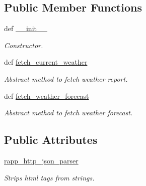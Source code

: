 \subsection*{Public Member Functions}
\begin{DoxyCompactItemize}
\item 
def \hyperlink{classrapp__weather__reporter_1_1weather__reporter__base_1_1WeatherReporterBase_aa0e1faaa2dcde236c7120c5c67dba93f}{\-\_\-\-\_\-init\-\_\-\-\_\-}
\begin{DoxyCompactList}\small\item\em Constructor. \end{DoxyCompactList}\item 
def \hyperlink{classrapp__weather__reporter_1_1weather__reporter__base_1_1WeatherReporterBase_adc2e313c45d4ec74f2d006cc6dce9ea4}{fetch\-\_\-current\-\_\-weather}
\begin{DoxyCompactList}\small\item\em Abstract method to fetch weather report. \end{DoxyCompactList}\item 
def \hyperlink{classrapp__weather__reporter_1_1weather__reporter__base_1_1WeatherReporterBase_aee6843b385bb5aa321ab7b4fd852bcdf}{fetch\-\_\-weather\-\_\-forecast}
\begin{DoxyCompactList}\small\item\em Abstract method to fetch weather forecast. \end{DoxyCompactList}\end{DoxyCompactItemize}
\subsection*{Public Attributes}
\begin{DoxyCompactItemize}
\item 
\hyperlink{classrapp__weather__reporter_1_1weather__reporter__base_1_1WeatherReporterBase_ac18124b549d9ff6e54551b96013e953d}{rapp\-\_\-http\-\_\-json\-\_\-parser}
\begin{DoxyCompactList}\small\item\em Strips html tags from strings. \end{DoxyCompactList}\end{DoxyCompactItemize}
